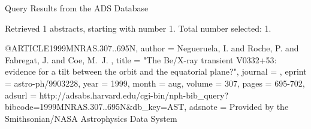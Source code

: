 Query Results from the ADS Database


Retrieved 1 abstracts, starting with number 1.  Total number selected: 1.

@ARTICLE{1999MNRAS.307..695N,
   author = {{Negueruela}, I. and {Roche}, P. and {Fabregat}, J. and {Coe}, M.~J.
	},
    title = "{The Be/X-ray transient V0332+53: evidence for a tilt between the orbit and the equatorial plane?}",
  journal = {\mnras},
   eprint = {astro-ph/9903228},
     year = 1999,
    month = aug,
   volume = 307,
    pages = {695-702},
   adsurl = {http://adsabs.harvard.edu/cgi-bin/nph-bib_query?bibcode=1999MNRAS.307..695N&db_key=AST},
  adsnote = {Provided by the Smithsonian/NASA Astrophysics Data System}
}


